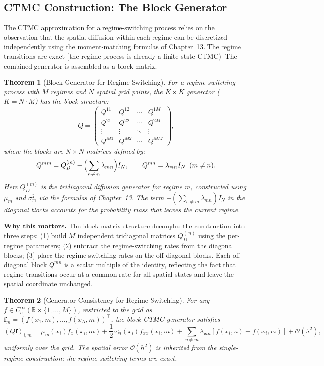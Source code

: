 \documentclass[11pt,a4paper,openany]{book}
\theoremstyle{definition}
\theoremstyle{plain}
\newtheorem{theorem}{Theorem}[chapter]
\theoremstyle{remark}
\newcommand{\1}{\mathbbm{1}}
\newcommand{\R}{\mathbb{R}}
\begin{document}
\subsection{CTMC Construction: The Block Generator}

The CTMC approximation for a regime-switching process relies on the observation that the spatial diffusion within each regime can be discretized independently using the moment-matching formulas of Chapter~13. The regime transitions are exact (the regime process is already a finite-state CTMC). The combined generator is assembled as a block matrix.

\begin{theorem}[Block Generator for Regime-Switching]
For a regime-switching process with $M$ regimes and $N$ spatial grid points, the $K \times K$ generator ($K = N \cdot M$) has the block structure:
\[
\boxed{Q = \begin{pmatrix}
Q^{11} & Q^{12} & \cdots & Q^{1M} \\
Q^{21} & Q^{22} & \cdots & Q^{2M} \\
\vdots & \vdots & \ddots & \vdots \\
Q^{M1} & Q^{M2} & \cdots & Q^{MM}
\end{pmatrix}},
\]
where the blocks are $N \times N$ matrices defined by:
\[
Q^{mm} = Q_{D}^{(m)} - \Bigl(\sum_{n \neq m} \lambda_{mn}\Bigr) I_{N}, \qquad
Q^{mn} = \lambda_{mn} I_{N} \;\; (m \neq n).
\]
Here $Q_{D}^{(m)}$ is the tridiagonal diffusion generator for regime $m$, constructed using $\mu_{m}$ and $\sigma_{m}^{2}$ via the formulas of Chapter~13. The term $-(\sum_{n \neq m} \lambda_{mn}) I_{N}$ in the diagonal blocks accounts for the probability mass that leaves the current regime.
\end{theorem}

\medskip
\noindent\textbf{Why this matters.} The block-matrix structure decouples the construction into three steps: (1) build $M$ independent tridiagonal matrices $Q_{D}^{(m)}$ using the per-regime parameters; (2) subtract the regime-switching rates from the diagonal blocks; (3) place the regime-switching rates on the off-diagonal blocks. Each off-diagonal block $Q^{mn}$ is a scalar multiple of the identity, reflecting the fact that regime transitions occur at a common rate for all spatial states and leave the spatial coordinate unchanged.

\begin{theorem}[Generator Consistency for Regime-Switching]
For any $f \in C_{c}^{\infty}(\R \times \{1,\ldots,M\})$, restricted to the grid as $\mathbf{f}_{m} = (f(x_{1},m), \ldots, f(x_{N},m))^{\top}$, the block CTMC generator satisfies
\[
(Q \mathbf{f})_{i,m} = \mu_{m}(x_{i}) f_{x}(x_{i},m) + \frac{1}{2} \sigma_{m}^{2}(x_{i}) f_{xx}(x_{i},m) + \sum_{n \neq m} \lambda_{mn} [f(x_{i},n) - f(x_{i},m)] + \mathcal{O}(h^{2}),
\]
uniformly over the grid. The spatial error $\mathcal{O}(h^{2})$ is inherited from the single-regime construction; the regime-switching terms are exact.
\end{theorem}
\end{document}
